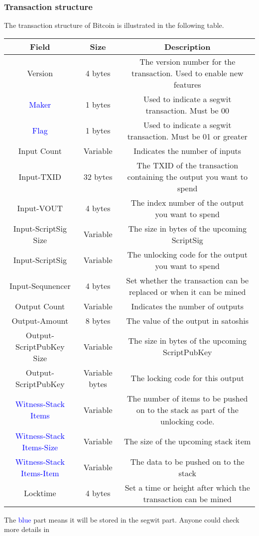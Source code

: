 \subsubsection{Transaction structure}

The transaction structure of Bitcoin is illustrated in the following table.

\begin{tabular}{|c|c|c|} \hline
    Field & Size & Description \\ \hline
    Version & 4 bytes & The version number for the transaction. Used to enable new features  \\ \hline
    \textcolor{blue}{Maker} & 1 bytes & Used to indicate a segwit transaction. Must be 00 \\ \hline
    \textcolor{blue}{Flag} & 1 bytes & Used to indicate a segwit transaction. Must be 01 or greater  \\ \hline
    Input Count & Variable & Indicates the number of inputs  \\ \hline
    Input-TXID & 32 bytes & The TXID of the transaction containing the output you want to spend  \\ \hline
    Input-VOUT & 4 bytes & The index number of the output you want to spend  \\ \hline
    Input-ScriptSig Size & Variable & The size in bytes of the upcoming ScriptSig  \\ \hline
    Input-ScriptSig & Variable & The unlocking code for the output you want to spend  \\ \hline
    Input-Sequnencer & 4 bytes & Set whether the transaction can be replaced or when it can be mined  \\ \hline
    Output Count & Variable & Indicates the number of outputs  \\ \hline
    Output-Amount & 8 bytes & The value of the output in satoshis  \\ \hline
    Output-ScriptPubKey Size & Variable & The size in bytes of the upcoming ScriptPubKey  \\ \hline
    Output-ScriptPubKey & Variable bytes & The locking code for this output  \\ \hline
    \textcolor{blue}{Witness-Stack Items} & Variable & The number of items to be pushed on to the stack as part of the unlocking code.  \\ \hline
    \textcolor{blue}{Witness-Stack Items-Size} & Variable & The size of the upcoming stack item  \\ \hline
    \textcolor{blue}{Witness-Stack Items-Item} & Variable & The data to be pushed on to the stack  \\ \hline
    Locktime & 4 bytes & Set a time or height after which the transaction can be mined  \\ \hline
\end{tabular}

The \textcolor{blue}{blue} part means it will be stored in the segwit part. Anyone could check more details in \cite{website:transaction-structure}
